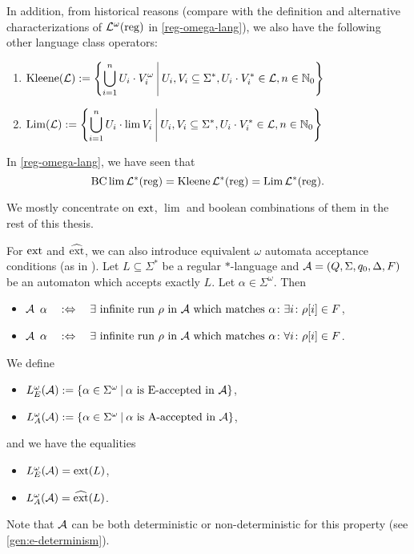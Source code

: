 In addition, from historical reasons (compare with the definition and alternative characterizations of $\mathcal{L}^\omega(\textup{\textrm{reg}})$ in \cref{reg-omega-lang}), we also have the following other language class operators:
\begin{enumerate}
\item $\displaystyle \Kleene(\Lang) := \Set{ \bigcup_{i=1}^n U_i \cdot V_i^\omega}{U_i, V_i \subseteq \Sigma^*, U_i \cdot V_i^* \in \Lang, n \in \N_0}$
\item $\displaystyle \limClosure(\Lang) := \Set{\bigcup_{i=1}^n U_i \cdot \lim V_i}{U_i, V_i \subseteq \Sigma^*, U_i \cdot V_i^* \in \Lang, n \in \N_0}$
\end{enumerate}
In \cref{reg-omega-lang}, we have seen that
\[ \operatorname{BC} \lim \mathcal{L}^*(\textup{\textrm{reg}}) = \operatorname{Kleene} \mathcal{L}^*(\textup{\textrm{reg}}) = \operatorname{Lim} \mathcal{L}^*(\textup{\textrm{reg}}) . \]

We mostly concentrate on $\operatorname{ext}$, $\lim$ and boolean combinations of them in the rest of this thesis.

For $\operatorname{ext}$ and $\operatorname{\widehat{ext}}$, we can also introduce equivalent $\omega$ automata acceptance conditions (as in \cite{InfCompR101}). Let $L \subseteq \Sigma^*$ be a regular $*$-language and $\mathcal{A} = (Q, \Sigma, q_0, \Delta, F)$ be an automaton which accepts exactly $L$. Let $\alpha \in \Sigma^\omega$. Then
\begin{itemize}
\item $\mathcal{A}$  $\alpha \ \ \ :\Leftrightarrow \ \ \ \exists \ \text{infinite run $\rho$ in $\A$ which matches $\alpha$} \colon \exists i \colon \rho[i] \in F$,
\item $\mathcal{A}$  $\alpha \ \ \ :\Leftrightarrow \ \ \ \exists \ \text{infinite run $\rho$ in $\A$ which matches $\alpha$} \colon \forall i \colon \rho[i] \in F$.
\end{itemize}
We define
\begin{itemize}
\item[] $L^\omega_E(\A) := \Set{\alpha \in \Sigma^\omega}{\text{$\alpha$ is E-accepted in $\A$}}$,
\item[] $L^\omega_A(\A) := \Set{\alpha \in \Sigma^\omega}{\text{$\alpha$ is A-accepted in $\A$}}$,
\end{itemize}
and we have the equalities
\begin{itemize}
\item[] $L^\omega_E(\mathcal{A}) = \operatorname{ext}(L)$,
\item[] $L^\omega_A(\mathcal{A}) = \operatorname{\widehat{ext}}(L)$.
\end{itemize}
Note that $\mathcal{A}$ can be both deterministic or non-deterministic for this property (see \cref{gen:e-determinism}).


